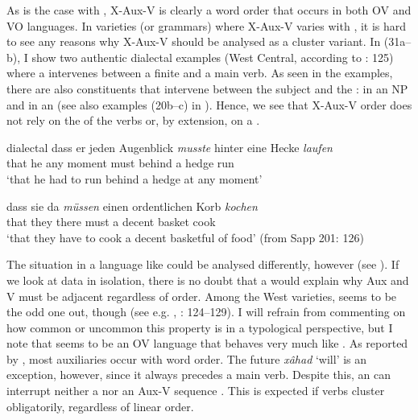 \documentclass[output=paper, colorlinks, citecolor=brown]{langscibook}
\begin{document}
As is the case with , X-Aux-V is clearly a word order that occurs in both OV and VO languages. In varieties (or grammars) where X-Aux-V varies with , it is hard to see any reasons why X-Aux-V should be analysed as a cluster variant. In (31a–b), I show two authentic dialectal  examples (West Central, according to \citealt{Sapp2011}: 125) where a  intervenes between a finite  and a main verb. As seen in the examples, there are also constituents that intervene between the subject and the : in  an NP  and in  an  (see also examples (20b–c) in ). Hence, we see that X-Aux-V order does not rely on the  of the verbs or, by extension, on a .



\ea dialectal 
\label{ex:sangfelt:31}
\ea\label{ex:sangfelt:31a}
\gll dass er {jeden} {Augenblick} \textit{musste}  {hinter} {eine} {Hecke} \textit{laufen} \\
that he any moment must behind a hedge run\\
\glt ‘that he had to run behind a hedge at any moment’

\ex\label{ex:sangfelt:31b}
\gll dass sie {da} \textit{müssen} {einen} {ordentlichen} {Korb} \textit{kochen}\\
that they there must a decent basket cook\\
\glt ‘that they have to cook a decent basketful of food’ (from Sapp 201: 126)\\
\z 
\z 

The situation in a language like  could be analysed differently, however (see ). If we look at  data in isolation, there is no doubt that a  would explain why Aux and V must be adjacent regardless of order. Among the West  varieties,  seems to be the odd one out, though (see e.g. \citealt{Haegeman1992}, \citealt{Sapp2011}: 124–129). I will refrain from commenting on how common or uncommon this property is in a typological perspective, but I note that  seems to be an OV language that behaves very much like . As reported by \citet[100]{Sheehan2017Final}, most  auxiliaries occur with  word order. The future  \textit{xâhad} ‘will’ is an exception, however, since it always precedes a main verb. Despite this, an  can interrupt neither a   nor an Aux-V sequence . This is expected if  verbs cluster obligatorily, regardless of linear order.
\end{document}
